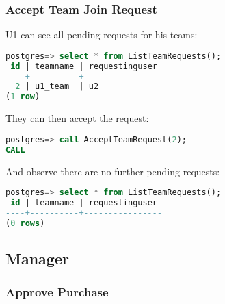 \subsubsection{Accept Team Join Request}

U1 can see all pending requests for his teams:

\begin{lstlisting}[language=SQL]
postgres=> select * from ListTeamRequests();
 id | teamname | requestinguser 
----+----------+----------------
  2 | u1_team  | u2
(1 row)
\end{lstlisting}


They can then accept the request:

\begin{lstlisting}[language=SQL]
postgres=> call AcceptTeamRequest(2);
CALL
\end{lstlisting}

And observe there are no further pending requests:

\begin{lstlisting}[language=SQL]
postgres=> select * from ListTeamRequests();
 id | teamname | requestinguser 
----+----------+----------------
(0 rows)
\end{lstlisting}

\subsection{Manager}

\subsubsection{Approve Purchase}
